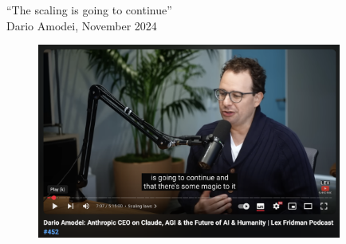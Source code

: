 \begin{vbframe}{``The scaling is going to continue''\\
Dario Amodei, November 2024}

\vfill

\begin{figure}
	\centering
	\includegraphics[width = 10cm]{./figure/amodeiscaling.png} \\ 
\end{figure}


\vfill

\end{vbframe}

\endlecture

